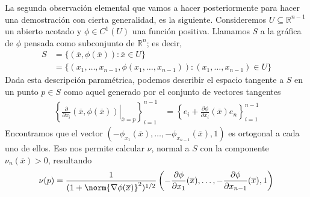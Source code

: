 \documentclass{report}
\newcommand{\realNumbers}{\mathbb{R}}
\theoremstyle{remark}
\begin{document}
  \newpage
  La segunda observación elemental que vamos a hacer posteriormente para hacer una demostración con cierta generalidad, es la siguiente.
  Consideremos \(U \subseteq \realNumbers^{n - 1}\) un abierto acotado y \(\phi \in C^1(U)\) una función positiva.
  Llamamos \(S\) a la gráfica de \(\phi\) pensada como subconjunto de \(\realNumbers^n\);
  es decir,
  \begin{align}
    S
    &=
    \{(\overline{x}, \phi(\overline{x})) : \overline{x} \in U\}
    \\
    &=
    \{(x_1, \dots, x_{n - 1}, \phi(x_1, \dots, x_{n - 1})) : (x_1, \dots, x_{n - 1}) \in U\}
  \end{align}
  Dada esta descripción paramétrica, podemos describir el espacio tangente a \(S\) en un punto \(p \in S\) como aquel generado por el conjunto de vectores tangentes
  \begin{align}
    \left\{
      \left.
        \frac{\partial}{\partial x_i}
        (\overline{x}, \phi(\overline{x}))
      \right\vert_{\overline{x} = p}
    \right\}_{i = 1}^{n - 1}
    &=
    \left\{
      e_i
      +
      \frac{\partial \phi}{\partial x_i}(\overline{x}) e_n
    \right\}_{i = 1}^{n - 1}
  \end{align}
  Encontramos que el vector \((- \phi_{x_1}(\overline{x}), \dots, - \phi_{x_{n - 1}}(\overline{x}), 1)\) es ortogonal a cada uno de ellos.
  Eso nos permite calcular \(\nu\), normal a \(S\) con la componente \(\nu_n(\overline{x}) > 0\), resultando
  \begin{align}
    \nu(p)
    =
    \frac{1}{(1 + \norm{\nabla \phi (\overline{x})}^2)^{1/2}}
    \left(
      - \frac{\partial \phi}{\partial x_1}(\overline{x}), \dots, - \frac{\partial \phi}{\partial x_{n - 1}}(\overline{x}),
      1
    \right)
  \end{align}
  
\end{document}
